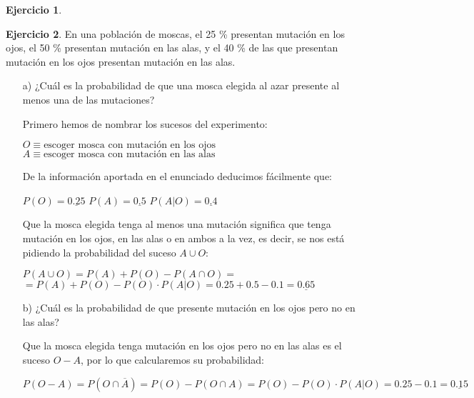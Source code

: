 \documentclass[a4paper, 12pt]{article}
\theoremstyle{definition}
\newtheorem{ej}{Ejercicio}
\begin{document}
\begin{ej}
\end{ej}

\begin{ej}
En una población de moscas, el 25 \% presentan mutación en los ojos, el 50 \% presentan mutación
en las alas, y el 40 \% de las que presentan mutación en los ojos presentan mutación en las alas.

\begin{enumerate}

\item[a)] ¿Cuál es la probabilidad de que una mosca elegida al azar presente al menos una de las
mutaciones?

Primero hemos de nombrar los sucesos del experimento:

\begin{center}
    $O \equiv \text{escoger mosca con mutación en los ojos}$
    $A \equiv \text{escoger mosca con mutación en las alas}$
\end{center}

De la información aportada en el enunciado deducimos fácilmente que:

\begin{center}
    $P(O) = \underline{0.25}$ \hspace{1cm} $P(A) = \underline{0.5}$ \hspace{1cm} $P(A|O) = \underline{0.4}$
\end{center}

Que la mosca elegida tenga al menos una mutación  significa que tenga mutación en los ojos, en las alas o en ambos a la vez, es decir, se nos está pidiendo la probabilidad del suceso $A\cup O$:

\begin{center}
    $P(A\cup O) = P(A) + P(O) - P(A\cap O) =$
    $= P(A) + P(O) - P(O)\cdot P(A|O) = 0.25 + 0.5 - 0.1 = \underline{0.65}$
\end{center}

\item[b)] ¿Cuál es la probabilidad de que presente mutación en los ojos pero no en las alas?

Que la mosca elegida tenga mutación en los ojos pero no en las alas es el suceso $O-A$, por lo que calcularemos su probabilidad:

\begin{center}
    $P(O-A) = P(O\cap \overline{A}) = P(O) - P(O\cap A) = P(O) - P(O)\cdot P(A|O) = 0.25 - 0.1 = \underline{0.15}$
\end{center}
\end{enumerate}
\end{ej}
\end{document}
